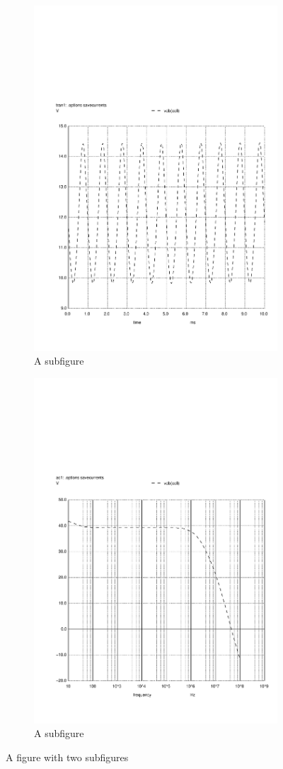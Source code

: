 \begin{figure}
    \centering
    \begin{subfigure}{.5\textwidth}
        \centering
        \includegraphics[width=.4\linewidth]{vo1.pdf}
        \caption{A subfigure}
        \label{fig:sub1}
    \end{subfigure}%
    \begin{subfigure}{.5\textwidth}
        \centering
        \includegraphics[width=.4\linewidth]{vo1f.pdf}
        \caption{A subfigure}
        \label{fig:sub2}
    \end{subfigure}
    \caption{A figure with two subfigures}
    \label{fig:test}
\end{figure}


